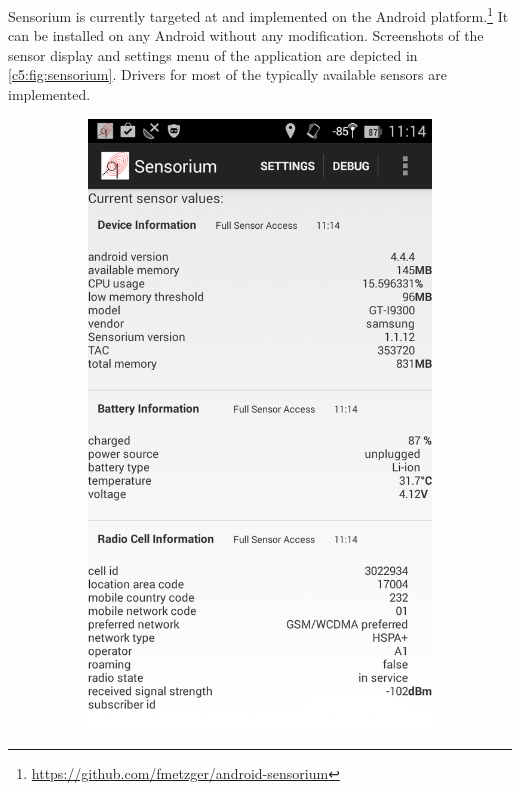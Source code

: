 Sensorium is currently targeted at and implemented on the Android platform.\footnote{\url{https://github.com/fmetzger/android-sensorium}} It can be installed on any Android without any modification. Screenshots of the sensor display and settings menu of the application are depicted in \ref{c5:fig:sensorium}. Drivers for most of the typically available sensors are implemented.

\begin{figure}[htb]
        \centering
        \begin{subfigure}[b]{0.45\textwidth}
            \centering
			\includegraphics[width=\textwidth]{images/sensorium.png}

\end{subfigure}
\end{figure}
